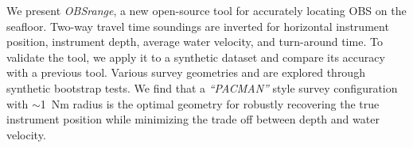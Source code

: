 We present \textit{OBSrange}, a new open-source tool for accurately locating OBS on the seafloor. Two-way travel time soundings are inverted for horizontal instrument position, instrument depth, average water velocity, and turn-around time. To validate the tool, we apply it to a synthetic dataset and compare its accuracy with a previous tool. Various survey geometries and are explored through synthetic bootstrap tests. We find that a \textit{``PACMAN''} style survey configuration with $\sim$1~Nm radius is the optimal geometry for robustly recovering the true instrument position while minimizing the trade off between depth and water velocity.



